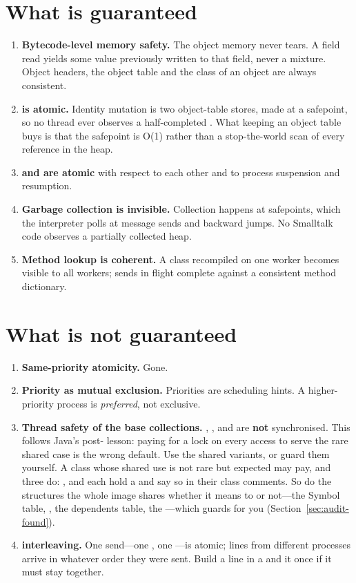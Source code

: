 \section{What is guaranteed}

\begin{enumerate}
\item \textbf{Bytecode-level memory safety.} The object memory never tears. A
  field read yields some value previously written to that field, never a
  mixture. Object headers, the object table and the class of an object are
  always consistent.
\item \textbf{ is atomic.} Identity mutation is two
  object-table stores, made at a safepoint, so no thread ever observes a
  half-completed . What keeping an object table buys is that the
  safepoint is O(1) rather than a stop-the-world scan of every reference in
  the heap.
\item \textbf{ and  are atomic} with respect to
  each other and to process suspension and resumption.
\item \textbf{Garbage collection is invisible.} Collection happens at
  safepoints, which the interpreter polls at message sends and backward jumps.
  No Smalltalk code observes a partially collected heap.
\item \textbf{Method lookup is coherent.} A class recompiled on one worker
  becomes visible to all workers; sends in flight complete against a
  consistent method dictionary.
\end{enumerate}

\section{What is not guaranteed}

\begin{enumerate}
\item \textbf{Same-priority atomicity.} Gone.
\item \textbf{Priority as mutual exclusion.} Priorities are scheduling hints.
  A higher-priority process is \emph{preferred}, not exclusive.
\item \textbf{Thread safety of the base collections.}
  , ,  and  are
  \textbf{not} synchronised. This follows Java's post- lesson:
  paying for a lock on every access to serve the rare shared case is the wrong
  default. Use the shared variants, or guard them yourself. A class whose
  shared use is not rare but expected may pay, and three do:
  ,  and  each hold a
   and say so in their class comments. So do the structures the
  whole image shares whether it means to or not---the Symbol table,
  , the dependents table, the ---which
   guards for you (Section~\ref{sec:audit-found}).
\item \textbf{ interleaving.} One send---one , one
  ---is atomic; lines from different processes arrive in whatever
  order they were sent. Build a line in a  and  it
  once if it must stay together.
\end{enumerate}

